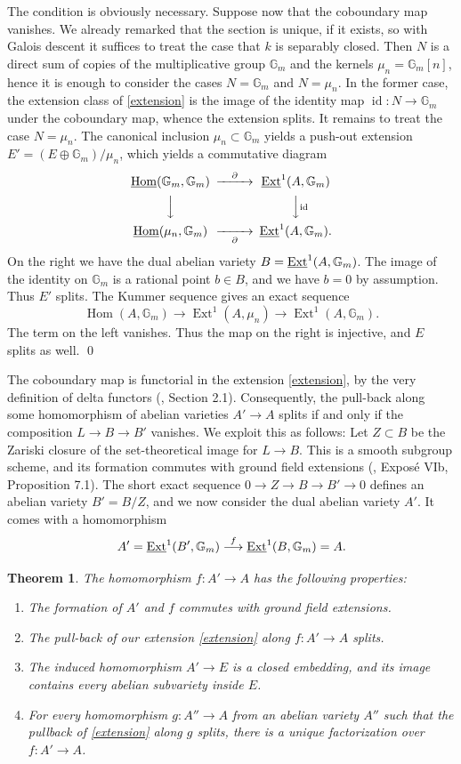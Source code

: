 \documentclass[oneside, 12pt]{amsart}
\newcommand\mylabel[1]{\label{#1}\marginpar{\raggedright\vspace{-1ex}\medskip\medskip\footnotesize \tt #1}}
\renewcommand\mylabel[1]{\label{#1}}
\newtheorem{theorem}{Theorem}[section]
\theoremstyle{definition}
\theoremstyle{remark}
\newcommand{\GG}{\mathbb{G}}
\newcommand{\Ext}{\operatorname{Ext}}
\newcommand{\Hom}{\operatorname{Hom}}
\newcommand{\id}{{\operatorname{id}}}
\newcommand{\lra}{\longrightarrow}
\newcommand{\ra}{\rightarrow}
\newcommand{\uHom}{\underline{\operatorname{Hom}}}
\begin{document}
\proof
The condition is obviously necessary. Suppose now that the coboundary map vanishes. 
We already remarked that the section is unique, if it exists,  so with Galois descent it suffices
to treat the case that $k$ is separably closed. Then $N$ is a direct sum of copies of the multiplicative group $\GG_m$ and the kernels $\mu_n=\GG_m[n]$,
hence it is enough to consider the cases $N=\GG_m$ and $N=\mu_n$.
In the former case, the extension class of \eqref{extension} is the image of the identity map $\id:N\ra \GG_m$ under the coboundary map,
whence the extension splits.
It remains to treat the case $N=\mu_n$. The canonical inclusion $\mu_n\subset\GG_m$ yields
a push-out extension $E'=(E\oplus\GG_m)/\mu_n$, which yields a commutative diagram
$$
\begin{CD}
\uHom(\GG_m,\GG_m) @>\partial>> \uExt^1(A,\GG_m)\\
@VVV                    @VV\id V\\
\uHom(\mu_n,\GG_m) @>>\partial> \uExt^1(A,\GG_m).
\end{CD}
$$
On the right we have the dual abelian variety $B=\uExt^1(A,\GG_m)$.
The image of the identity on $\GG_m$ is a rational point $b\in B$, and we have $b=0$ by assumption.
  Thus $E'$ splits. The Kummer sequence gives an exact sequence
$$
\Hom(A,\GG_m)\lra \Ext^1(A,\mu_n)\lra \Ext^1(A,\GG_m).
$$ 
The term on the left vanishes. Thus the map on the right is injective, and $E$ splits as well.
\qed

\medskip
The coboundary map is functorial in the extension \eqref{extension}, by the very definition of delta functors
(\cite{Grothendieck 1957}, Section 2.1).
Consequently, the pull-back along some homomorphism of abelian varieties $A'\ra A$ splits if and only
if the composition $L\ra B\ra B'$ vanishes.
We exploit this as follows:
Let $Z\subset B$ be the Zariski closure of the set-theoretical image for $L\ra B$.
 This is a smooth subgroup scheme, and its formation commutes with ground field extensions
(\cite{SGA 3b}, Expos\'e VIb, Proposition 7.1).
The short exact sequence $0\ra Z\ra B\ra B'\ra 0$ defines an abelian variety $B'=B/Z$, and we now consider
the dual abelian variety $A'$. It comes with a homomorphism
$$
A'=\uExt^1(B',\GG_m)\stackrel{f}{\lra} \uExt^1(B,\GG_m)=A.
$$

\begin{theorem}
\mylabel{splitting map}
The homomorphism $f:A'\ra A$ has the following properties:
\begin{enumerate}
\item The formation of $A'$ and $f$ commutes with ground field extensions.
\item The pull-back of our extension \eqref{extension} along $f:A'\ra A$ splits.
\item The induced homomorphism $A'\ra E$ is a closed embedding, and its image contains every abelian subvariety inside $E$.
\item For every homomorphism $g:A''\ra A$ from an abelian variety $A''$ such that the pullback of \eqref{extension} along $g$ splits,
there is a unique factorization over $f:A'\ra A$.
\end{enumerate}
\end{theorem}
 
\end{document}
